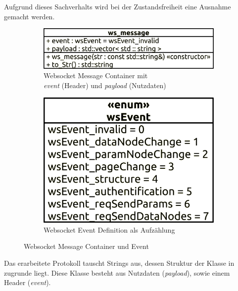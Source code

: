 Aufgrund dieses Sachverhalts wird bei der Zustandsfreiheit eine Ausnahme gemacht werden.\\
\begin{figure}[ht]
  \centering
  \begin{subfigure}[b]{0.601833561\textwidth}
    \includegraphics[width=\textwidth]{content/hauptteil/systemEntwurf/res/protokoll/ws_Message.pdf}
    \caption{Websocket Message Container mit \\ \emph{event} (Header) und \emph{payload} (Nutzdaten)}
    \label{fig:CDWME:ws_message}
  \end{subfigure}
  \hfill
  \begin{subfigure}[b]{0.388166439\textwidth}
    \includegraphics[width=\textwidth]{content/hauptteil/systemEntwurf/res/protokoll/wsEvent.pdf}
    \caption{Websocket Event Definition als Aufzählung}
    \label{fig:CDWME:wsEvent}
  \end{subfigure}
  \caption[Websocket Message Container und Event]{Websocket Message Container und Event}
  \label{fig:CDWME}
\end{figure}
Das erarbeitete Protokoll tauscht Strings aus, dessen Struktur der Klasse in  zugrunde liegt.
Diese Klasse besteht aus Nutzdaten (\emph{payload}), sowie einem Header (\emph{event}).
